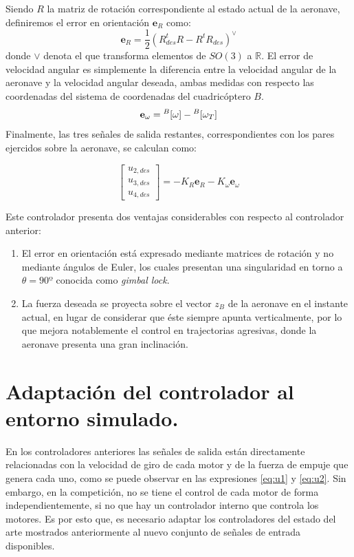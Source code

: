 Siendo $R$ la matriz de rotación correspondiente al estado actual de la aeronave, definiremos el error en orientación $\mathbf{e}_R $ como:
\begin{equation}
	\mathbf{e}_R = \frac{1}{2}\left(R_{des}^t R - R^t R_{des} \right)^\vee
\end{equation}
donde $\vee$ denota el  que transforma elementos de $SO(3)$ a $\mathbb{R}$. El error de velocidad angular es simplemente la diferencia entre la velocidad angular de la aeronave y la velocidad angular deseada, ambas medidas con respecto las coordenadas del sistema de coordenadas del cuadricóptero $B$.
\begin{equation}
	\mathbf{e}_\omega = \null^B[\omega]-\null^B[\omega_T] 
\end{equation}
Finalmente, las tres señales de salida restantes, correspondientes con los pares ejercidos sobre la aeronave, se calculan como:

\begin{equation}
	\label{eq:u2_non_linearized}
\begin{bmatrix}
	u_{2,des}\\u_{3,des}\\u_{4,des} 
\end{bmatrix}= -K_R	\mathbf{e}_R - K_\omega	\mathbf{e}_\omega
\end{equation}

Este controlador presenta dos ventajas considerables con respecto al controlador anterior:
\begin{enumerate}
	\item El error en orientación está expresado mediante matrices de rotación y no mediante ángulos de Euler, los cuales presentan una singularidad en torno a $\theta = 90º$ conocida como \textit{gimbal lock}.
	\item La fuerza deseada se proyecta sobre el vector $z_B$ de la aeronave en el instante actual, en lugar de considerar que éste siempre apunta verticalmente, por lo que mejora notablemente el control en trajectorias agresivas, donde la aeronave presenta una gran inclinación.
\end{enumerate}

\newpage
\section{Adaptación del controlador al entorno simulado.}

En los controladores anteriores las señales de salida están directamente relacionadas con la velocidad de giro de cada motor y de la fuerza de empuje que genera cada uno, como se puede observar en las expresiones \ref{eq:u1} y \ref{eq:u2}. Sin embargo, en la competición, no se tiene el control de cada motor de forma independientemente, si no que hay un controlador interno que controla los motores. Es por esto que, es necesario adaptar los controladores del estado del arte mostrados anteriormente al nuevo conjunto de señales de entrada disponibles.

